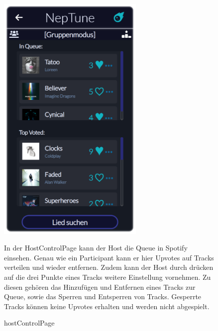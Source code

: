 \documentclass[oneside, ngerman]{sdqtechreport}
\begin{document}
\begin{figure}
    \hypertarget{hostControlPage}{}
    \begin{minipage}[t]{7 cm}
        \vspace{-1.5ex}
        \includegraphics[width=7cm]{LATEX/Pflichtenheft/GraphicDesigns/hostControlPage.png}
        \caption{hostControlPage}
    \end{minipage}
    \hspace{1cm}
    \begin{minipage}[t]{7 cm}
        \vspace{1cm}
        In der HostControlPage kann der Host die Queue in Spotify einsehen. Genau wie ein Participant kann er hier Upvotes auf Tracks verteilen und wieder entfernen. Zudem kann der Host durch drücken auf die drei Punkte eines Tracks weitere Einstellung vornehmen. Zu diesen gehören das Hinzufügen und Entfernen eines Tracks zur Queue, sowie das Sperren und Entsperren von Tracks. Gesperrte Tracks können keine Upvotes erhalten und werden nicht abgespielt.
    \end{minipage}
\end{figure}
\end{document}
